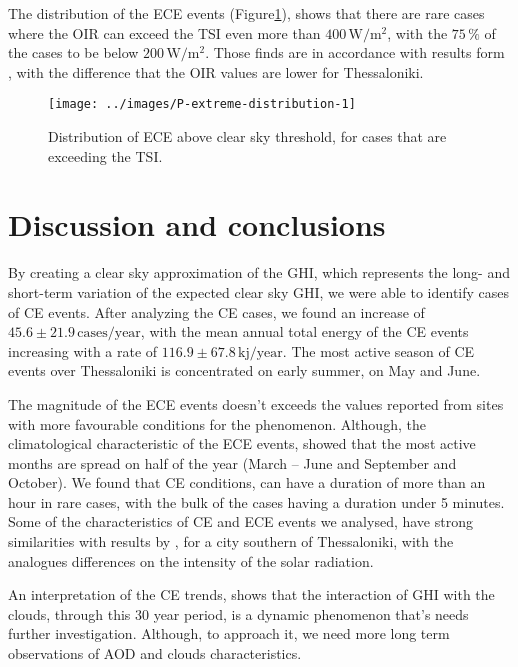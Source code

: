 \documentclass[preprint, 5p,
authoryear]{elsarticle} %
\begin{document}
The distribution of the ECE events
(Figure\nobreakspace{}\ref{fig:P-extreme-distribution}), shows that
there are rare cases where the OIR can exceed the TSI even more than
\(400\,\text{W}/\text{m}^2\), with the \(75\,\%\) of the cases to be
below \(200\,\text{W}/\text{m}^2\). Those finds are in accordance with
results form \citet{Vamvakas2020}, with the difference that the OIR
values are lower for Thessaloniki.

\begin{figure}

{\centering \texttt{[image: ../images/P-extreme-distribution-1]} 

}

\caption{Distribution of ECE above clear sky threshold, for cases that are exceeding the TSI.}\label{fig:P-extreme-distribution}
\end{figure}

\hypertarget{discussion-and-conclusions}{%
\section{Discussion and conclusions}\label{discussion-and-conclusions}}

By creating a clear sky approximation of the GHI, which represents the
long- and short-term variation of the expected clear sky GHI, we were
able to identify cases of CE events. After analyzing the CE cases, we
found an increase of \(45.6\pm 21.9\,\text{cases}/\text{year}\), with
the mean annual total energy of the CE events increasing with a rate of
\(116.9\pm 67.8\,\text{kj}/\text{year}\). The most active season of CE
events over Thessaloniki is concentrated on early summer, on May and
June.

The magnitude of the ECE events doesn't exceeds the values reported from
sites with more favourable conditions for the phenomenon. Although, the
climatological characteristic of the ECE events, showed that the most
active months are spread on half of the year (March -- June and
September and October). We found that CE conditions, can have a duration
of more than an hour in rare cases, with the bulk of the cases having a
duration under 5 minutes. Some of the characteristics of CE and ECE
events we analysed, have strong similarities with results by
\citet{Vamvakas2020}, for a city southern of Thessaloniki, with the
analogues differences on the intensity of the solar radiation.

An interpretation of the CE trends, shows that the interaction of GHI
with the clouds, through this 30 year period, is a dynamic phenomenon
that's needs further investigation. Although, to approach it, we need
more long term observations of AOD and clouds characteristics.
\end{document}
